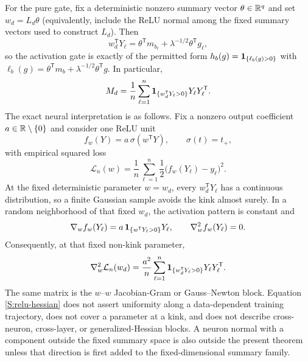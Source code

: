 For the pure gate, fix a deterministic nonzero summary vector
$\theta\in\mathbb{R}^q$ and set $w_d=L_d\theta$ (equivalently, include the ReLU
normal among the fixed summary vectors used to construct $L_d$).  Then
\begin{equation}
w_d^{\mathsf T}Y_\ell
=
\theta^{\mathsf T}m_{b_\ell}
+\lambda^{-1/2}\theta^{\mathsf T}g_\ell,
\end{equation}
so the activation gate is exactly of the permitted form
$h_b(g)=\mathbf{1}_{\{\ell_b(g)>0\}}$ with
$\ell_b(g)=\theta^{\mathsf T}m_b+\lambda^{-1/2}\theta^{\mathsf T}g$.
In particular,
\begin{equation}
M_d=\frac1n\sum_{\ell=1}^n
\mathbf{1}_{\{w_d^{\mathsf T}Y_\ell>0\}}Y_\ell Y_\ell^{\mathsf T}.
\end{equation}
The exact neural interpretation is as follows. Fix a nonzero output coefficient
$a\in\mathbb{R}\setminus\{0\}$ and consider one ReLU unit
\begin{equation}
f_w(Y)=a\,\sigma(w^{\mathsf T}Y),
\qquad
\sigma(t)=t_+,
\end{equation}
with empirical squared loss
\begin{equation}
\mathcal L_n(w)
=
\frac1n\sum_{\ell=1}^n
\frac12\bigl(f_w(Y_\ell)-y_\ell\bigr)^2.
\end{equation}
At the fixed deterministic parameter $w=w_d$, every
$w_d^{\mathsf T}Y_\ell$ has a continuous distribution, so a finite
Gaussian sample avoids the kink almost surely. In a random neighborhood of
that fixed $w_d$, the activation pattern is constant and
\begin{equation}
\nabla_w f_w(Y_\ell)
=
a\,\mathbf{1}_{\{w^{\mathsf T}Y_\ell>0\}}Y_\ell,
\qquad
\nabla_w^2 f_w(Y_\ell)=0.
\end{equation}
Consequently, at that fixed non-kink parameter,
\begin{equation}
\nabla_w^2\mathcal L_n(w_d)
=
\frac{a^2}{n}\sum_{\ell=1}^n
\mathbf{1}_{\{w_d^{\mathsf T}Y_\ell>0\}}Y_\ell Y_\ell^{\mathsf T}.
\label{S:relu-hessian}
\end{equation}
The same matrix is the $w$--$w$ Jacobian-Gram or Gauss--Newton block.
Equation \eqref{S:relu-hessian} does not assert uniformity along a
data-dependent training trajectory, does not cover a parameter at a kink,
and does not describe cross-neuron, cross-layer, or generalized-Hessian
blocks.  A neuron normal with a component outside the fixed summary space is
also outside the present theorem unless that direction is first added to the
fixed-dimensional summary family.

